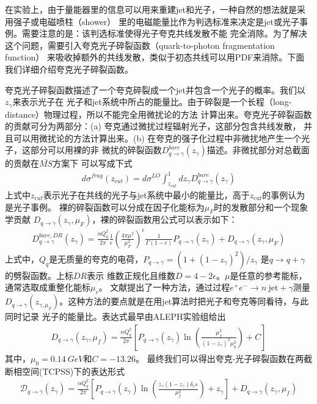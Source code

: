 在实验上，由于量能器里的信息可以用来重建jet和光子，一种自然的想法就是采用强子或电磁喷柱（shower）
里的电磁能量比作为判选标准来决定是jet或光子事例。需要注意的是：该判选标准使得光子夸克共线发散不能
完全消除。为了解决这个问题，需要引入夸克光子碎裂函数（quark-to-photon fragmentation function）
来吸收掉额外的共线发散，类似于初态共线可以用PDF来消除。下面我们详细介绍夸克光子碎裂函数。

夸克光子碎裂函数描述了一个夸克碎裂成一个jet并包含一个光子的概率。我们以$z_{\gamma}$来表示光子在
光子和jet系统中所占的能量比。由于碎裂是一个长程（long-distance）物理过程，所以不能完全用微扰论的方法
计算出来。夸克光子碎裂函数的贡献可分为两部分：(a) 夸克通过微扰过程辐射光子，这部分包含共线发散，
并且可以用微扰论的方法计算出来。(b) 在夸克的强子化过程中非微扰地产生一个光子，这部分可以用裸的非
微扰的碎裂函数$D^{bare}_{q\to\gamma}(z_{\gamma})$描述。非微扰部分对总截面的贡献在$\bar{MS}$方案下
可以写成下式
\begin{eqnarray}
d\sigma^{frag}(z_{cut}) = d\sigma^{LO}\int^1_{z_{cut}} dz_{\gamma} D^{bare}_{q\to\gamma}(z_{\gamma})
\end{eqnarray}
上式中$z_{cut}$表示光子在共线的光子与jet系统中最小的能量比，高于$z_{cut}$的事例认为是光子事例。
裸的碎裂函数可以分成在因子化能标为$\mu_F$时的发散部分和一个现象学贡献
$D_{q\to\gamma}(z_{\gamma},\mu_F)$，裸的碎裂函数用公式可以表示如下：
\begin{eqnarray}
D^{bare, DR}_{q\to\gamma}(z_{\gamma}) = \frac{\alpha Q^2_q}{2\pi}\frac{1}{\epsilon}\left(\frac{4\pi\mu^2}
{\mu^2_F}\right)^{\epsilon}\frac{1}{\Gamma(1-\epsilon)}P_{q\to\gamma}(z_{\gamma}) + 
D_{q\to\gamma}(z_{\gamma},\mu_F)
\end{eqnarray}
上式中，$Q_q$是无质量的夸克的电荷，$P_{q\to\gamma} = (1+(1-z_{\gamma})^2)/z_{\gamma}$
是$q\to q+\gamma$的劈裂函数。上标$DR$表示
维数正规化且维数$D = 4-2\epsilon$。$\mu$是任意的参考能标，通常选取成重整化能标$\mu_r$。
文献\cite{maasureD}提出了一种方法，通过过程$e^+e^-\to n~\textrm{jet} + \gamma$测量
$D_{q\to\gamma}(z_{\gamma,\mu_F})$。这种方法的要点就是在用jet算法时把光子和夸克等同看待，与此同时记录
光子的能量比。表达式最早由ALEPH实验组给出\cite{ALEPH}
\begin{eqnarray}
D_{q\to\gamma}(z_{\gamma}, \mu_f) = \frac{\alpha Q^2_q}{2\pi}\left[ P_{q\to\gamma}(z_{\gamma})
\ln\left( \frac{\mu^2_f}{(1-z_{\gamma})^2\mu^2_0}\right) + C \right]
\end{eqnarray}
其中，$\mu_0 = 0.14~GeV$和$C = -13.26$。
最终我们可以得出夸克-光子碎裂函数在两截断相空间(TCPSS)\cite{TCPSS}下的表达形式
\begin{eqnarray}
{\mathscr D}_{q\to \gamma}(z_{\gamma}) = \frac{\alpha Q^2_q}{2\pi}
\left[P_{q\to\gamma}\left(z_{\gamma}\right) \ln\left(\frac{z_{\gamma}\left(1-z_{\gamma}\right)\delta_c s}{\mu^2_f}\right) + z_{\gamma}\right] + D_{q\to\gamma}(z_{\gamma},\mu_f)
\end{eqnarray}


